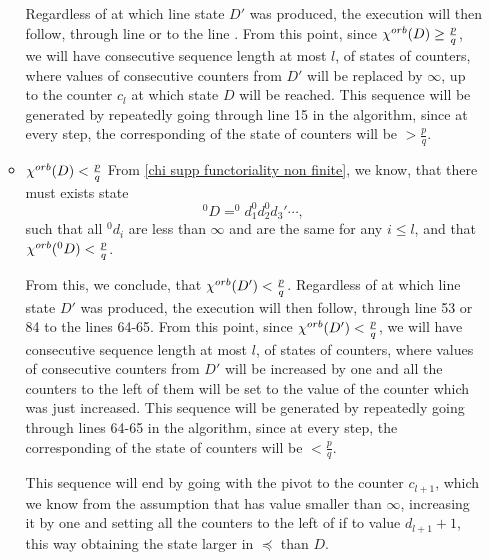 \begin{itemize}
\begin{itemize}
Regardless of at which line state $D'$ was produced, the execution will then follow, 
through line  or to the line    . From this point, since ${\chi^{orb}(D)} \geq \frac{p}{q}$, we will 
have consecutive sequence length at most $l$, of states of counters, where 
values of consecutive counters 
from $D'$ will be 
replaced by $\infty$, up to the counter $c_l$ at which state $D$ will be reached. 
This sequence will be generated by repeatedly going through line 15 in the algorithm, since 
at every step, the corresponding \Eoc of the state of counters will be $> \frac{p}{q}$.

\item ${\chi^{orb}(D)} < \frac{p}{q}$
From \ref{chi supp functoriality non finite}, we know, that there must exists state 
\begin{equation}^0D = ^0d_1^0d_2^0d_3'\cdots,
\end{equation} 
such that 
all $^0d_i$ are less than $\infty$ and are the same for 
any $i \leq l$, and that ${\chi^{orb}(^0D)} < \frac{p}{q}$. 

From this, we conclude, that ${\chi^{orb}(D')} < \frac{p}{q}$. 
Regardless of at which line state $D'$ was produced, the execution will then follow, 
through line 53 or 84 to the lines 64-65. From this point, since ${\chi^{orb}(D')} < \frac{p}{q}$, 
we will 
have consecutive sequence length at most $l$, of states of counters, where 
values of consecutive counters 
from $D'$ will be increased by one and all the counters to the left of them will be set to 
the value of the counter which was just increased. 
This sequence will be generated by repeatedly going through lines 64-65 in the algorithm, since 
at every step, the corresponding \Eoc of the state of counters will be $< \frac{p}{q}$.

This sequence will end by going with the pivot to the counter $c_{l+1}$, which we 
know from the assumption that has value smaller than $\infty$, increasing it by one 
and setting all the counters to the left of if to value $d_{l+1}+1$, this way obtaining 
the state larger in $\preceq$ than $D$. 
\end{itemize}


\end{itemize}
